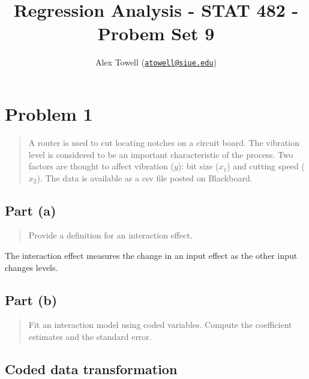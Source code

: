 \documentclass[
]{article}
\title{Regression Analysis - STAT 482 - Probem Set 9}
\author{Alex Towell
(\href{mailto:atowell@siue.edu}{\nolinkurl{atowell@siue.edu}})}
\date{}
\begin{document}
\maketitle

\newcommand{\sos}[1]{\mathrm{SS_{#1}}}
\newcommand{\ms}[1]{\mathrm{MS_{#1}}}
\newcommand{\sd}{\operatorname{sd}}
\newcommand{\var}{\operatorname{var}}
\newcommand{\expect}{\operatorname{E}}
\newcommand{\corr}{\operatorname{cor}}
\newcommand{\cov}{\operatorname{cov}}
\newcommand{\se}{\operatorname{se}}
\newcommand{\eval}[2]{\left. #1 \right\vert_{#2}}
\newcommand{\degf}[1]{\mathrm{df_{#1}}}
\newcommand{\entropy}{\operatorname{H}}

\hypertarget{problem-1}{%
\section{Problem 1}\label{problem-1}}

\begin{quote}
A router is used to cut locating notches on a circuit board. The
vibration level is considered to be an important characteristic of the
process. Two factors are thought to affect vibration (\(y\)): bit size
(\(x_1\)) and cutting speed (\(x_2\)). The data is available as a csv
file posted on Blackboard.
\end{quote}

\hypertarget{part-a}{%
\subsection{Part (a)}\label{part-a}}

\begin{quote}
Provide a definition for an interaction effect.
\end{quote}

The interaction effect measures the change in an input effect as the
other input changes levels.

\hypertarget{part-b}{%
\subsection{Part (b)}\label{part-b}}

\begin{quote}
Fit an interaction model using coded variables. Compute the coefficient
estimates and the standard error.
\end{quote}

\hypertarget{coded-data-transformation}{%
\subsection{Coded data transformation}\label{coded-data-transformation}}
\end{document}
